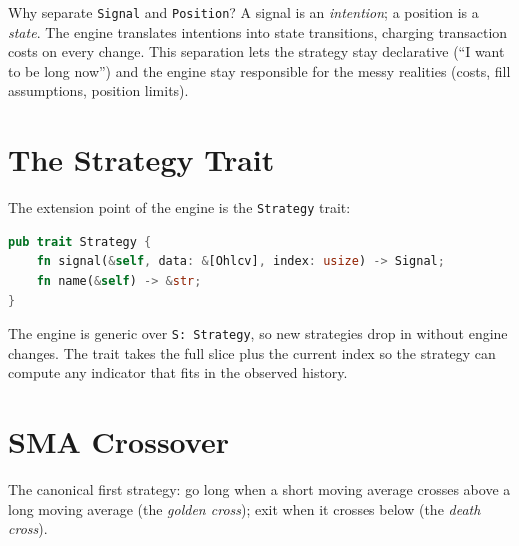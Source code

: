 \begin{keyinsight}
Why separate \texttt{Signal} and \texttt{Position}? A signal is an
\emph{intention}; a position is a \emph{state}. The engine translates
intentions into state transitions, charging transaction costs on every
change. This separation lets the strategy stay declarative (``I want to be
long now'') and the engine stay responsible for the messy realities
(costs, fill assumptions, position limits).
\end{keyinsight}

\section{The Strategy Trait}


The extension point of the engine is the \texttt{Strategy} trait:

\begin{lstlisting}[language=Rust]
pub trait Strategy {
    fn signal(&self, data: &[Ohlcv], index: usize) -> Signal;
    fn name(&self) -> &str;
}
\end{lstlisting}

The engine is generic over \texttt{S: Strategy}, so new strategies drop in
without engine changes. The trait takes the full slice plus the current index
so the strategy can compute any indicator that fits in the observed history.

\section{SMA Crossover}

The canonical first strategy: go long when a short moving average crosses
above a long moving average (the \emph{golden cross}); exit when it crosses
below (the \emph{death cross}).


